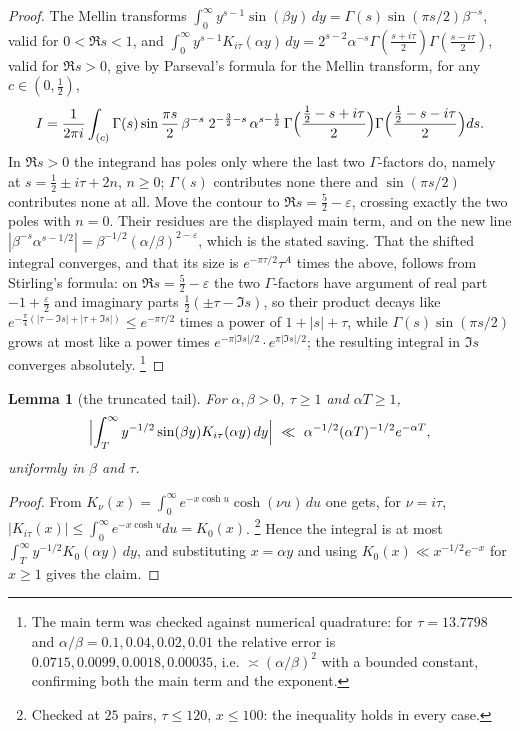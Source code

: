 \documentclass[11pt,a4paper]{article}
\newtheorem{lemma}[theorem]{Lemma}
\theoremstyle{remark}\newtheorem{remark}[theorem]{Remark}
\begin{document}
\begin{proof}
The Mellin transforms $\int_0^\infty y^{s-1}\sin(\beta y)\,dy=\Gamma(s)\sin(\pi s/2)\beta^{-s}$, valid for
$0<\Re s<1$, and $\int_0^\infty y^{s-1}K_{i\tau}(\alpha y)\,dy=2^{s-2}\alpha^{-s}\Gamma(\tfrac{s+i\tau}2)\Gamma(\tfrac{s-i\tau}2)$,
valid for $\Re s>0$, give by Parseval's formula for the Mellin transform, for any $c\in(0,\tfrac12)$,
\begin{equation}\label{eq:MB}
I=\frac1{2\pi i}\int_{(c)}\Gamma(s)\sin\frac{\pi s}2\,\beta^{-s}\;2^{-\frac32-s}\,\alpha^{s-\frac12}\,
\Gamma\Bigl(\frac{\frac12-s+i\tau}2\Bigr)\Gamma\Bigl(\frac{\frac12-s-i\tau}2\Bigr)ds .
\end{equation}
In $\Re s>0$ the integrand has poles only where the last two $\Gamma$-factors do, namely at
$s=\tfrac12\pm i\tau+2n$, $n\ge0$; $\Gamma(s)$ contributes none there and $\sin(\pi s/2)$ contributes none at all.
Move the contour to $\Re s=\tfrac52-\varepsilon$, crossing exactly the two poles with $n=0$. Their residues are the
displayed main term, and on the new line $|\beta^{-s}\alpha^{s-1/2}|=\beta^{-1/2}(\alpha/\beta)^{2-\varepsilon}$, which
is the stated saving. That the shifted integral converges, and that its size is
$e^{-\pi\tau/2}\tau^{A}$ times the above, follows from Stirling's formula: on $\Re s=\tfrac52-\varepsilon$ the two
$\Gamma$-factors have argument of real part $-1+\tfrac\varepsilon2$ and imaginary parts $\tfrac12(\pm\tau-\Im s)$, so
their product decays like $e^{-\frac\pi4(|\tau-\Im s|+|\tau+\Im s|)}\le e^{-\pi\tau/2}$ times a power of
$1+|s|+\tau$, while $\Gamma(s)\sin(\pi s/2)$ grows at most like a power times $e^{-\pi|\Im s|/2}\cdot e^{\pi|\Im s|/2}$;
the resulting integral in $\Im s$ converges absolutely. \footnote{The main term was checked against numerical quadrature:
for $\tau=13.7798$ and $\alpha/\beta=0.1,0.04,0.02,0.01$ the relative error is $0.0715,0.0099,0.0018,0.00035$, i.e.
$\asymp(\alpha/\beta)^2$ with a bounded constant, confirming both the main term and the exponent.}
\end{proof}

\begin{lemma}[the truncated tail]\label{lem:tail}
For $\alpha,\beta>0$, $\tau\ge1$ and $\alpha T\ge1$,
\[
\Bigl|\int_T^\infty y^{-1/2}\sin(\beta y)K_{i\tau}(\alpha y)\,dy\Bigr|\ \ll\ \alpha^{-1/2}(\alpha T)^{-1/2}e^{-\alpha T},
\]
uniformly in $\beta$ and $\tau$.
\end{lemma}
\begin{proof}
From $K_\nu(x)=\int_0^\infty e^{-x\cosh u}\cosh(\nu u)\,du$ one gets, for $\nu=i\tau$,
$|K_{i\tau}(x)|\le\int_0^\infty e^{-x\cosh u}du=K_0(x)$. \footnote{Checked at $25$ pairs, $\tau\le120$, $x\le100$: the
inequality holds in every case.} Hence the integral is at most $\int_T^\infty y^{-1/2}K_0(\alpha y)\,dy$, and
substituting $x=\alpha y$ and using $K_0(x)\ll x^{-1/2}e^{-x}$ for $x\ge1$ gives the claim.
\end{proof}
\end{document}
